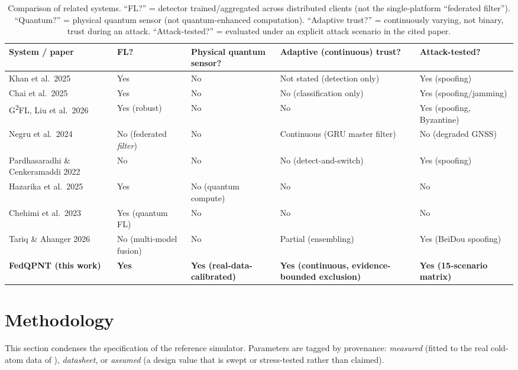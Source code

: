 \documentclass[12pt,a4paper]{article}
\begin{document}
\begin{table}[ht]
\centering
\caption{Comparison of related systems. ``FL?'' = detector trained/aggregated across distributed clients (not the single-platform ``federated filter''). ``Quantum?'' = physical quantum sensor (not quantum-enhanced computation). ``Adaptive trust?'' = continuously varying, not binary, trust during an attack. ``Attack-tested?'' = evaluated under an explicit attack scenario in the cited paper.}
\label{tab:comparison}
\footnotesize
\begin{tabular}{p{3.0cm}p{1.8cm}p{2.0cm}p{3.4cm}p{2.3cm}}
\toprule
System / paper & FL? & Physical quantum sensor? & Adaptive (continuous) trust? & Attack-tested? \\
\midrule
Khan et al.\ 2025 \cite{khan2025enhancing} & Yes & No & Not stated (detection only) & Yes (spoofing) \\
Chai et al.\ 2025 \cite{chai2025navigation} & Yes & No & No (classification only) & Yes (spoofing/jamming) \\
G\textsuperscript{2}FL, Liu et al.\ 2026 \cite{liu2026g2fl} & Yes (robust) & No & No & Yes (spoofing, Byzantine) \\
Negru et al.\ 2024 \cite{negru2024resilient} & No (federated \emph{filter}) & No & Continuous (GRU master filter) & No (degraded GNSS) \\
Pardhasaradhi \& Cenkeramaddi 2022 \cite{pardhasaradhi2022gps} & No & No & No (detect-and-switch) & Yes (spoofing) \\
Hazarika et al.\ 2025 \cite{hazarika2025quantum} & Yes & No (quantum compute) & No & No \\
Chehimi et al.\ 2023 \cite{chehimi2023foundations} & Yes (quantum FL) & No & No & No \\
Tariq \& Ahanger 2026 \cite{tariq2026multimodel} & No (multi-model fusion) & No & Partial (ensembling) & Yes (BeiDou spoofing) \\
\textbf{FedQPNT (this work)} & \textbf{Yes} & \textbf{Yes (real-data-calibrated)} & \textbf{Yes (continuous, evidence-bounded exclusion)} & \textbf{Yes (15-scenario matrix)} \\
\bottomrule
\end{tabular}
\end{table}

\section{Methodology}
\label{sec:method}
This section condenses the specification of the reference simulator. Parameters are tagged by provenance: \emph{measured} (fitted to the real cold-atom data of \cite{darmagnac2024atom}), \emph{datasheet}, or \emph{assumed} (a design value that is swept or stress-tested rather than claimed).
\end{document}
